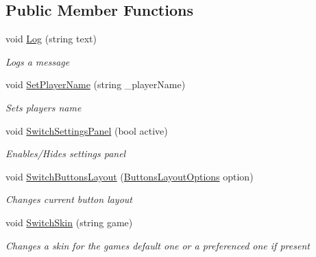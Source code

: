 \subsection*{Public Member Functions}
\begin{DoxyCompactItemize}
\item 
void \mbox{\hyperlink{class_game_pad_1_1_u_i_controller_client_ad3030f084a50b36bd6039fcad102ec37}{Log}} (string text)
\begin{DoxyCompactList}\small\item\em Logs a message \end{DoxyCompactList}\item 
void \mbox{\hyperlink{class_game_pad_1_1_u_i_controller_client_add5a4227e04750b0474cc7736111d227}{Set\+Player\+Name}} (string \+\_\+player\+Name)
\begin{DoxyCompactList}\small\item\em Sets player\textquotesingle{}s name \end{DoxyCompactList}\item 
void \mbox{\hyperlink{class_game_pad_1_1_u_i_controller_client_adf73d4fefd79c649154866d472723253}{Switch\+Settings\+Panel}} (bool active)
\begin{DoxyCompactList}\small\item\em Enables/\+Hides settings panel \end{DoxyCompactList}\item 
void \mbox{\hyperlink{class_game_pad_1_1_u_i_controller_client_a745defd9f8ebfc0c3879faf51a85f1b5}{Switch\+Buttons\+Layout}} (\mbox{\hyperlink{namespace_game_pad_ad65f651e47321df25402246e8df26c37}{Buttons\+Layout\+Options}} option)
\begin{DoxyCompactList}\small\item\em Changes current button layout \end{DoxyCompactList}\item 
void \mbox{\hyperlink{class_game_pad_1_1_u_i_controller_client_a8b12fd8cebf596535a29ef824beeadaa}{Switch\+Skin}} (string game)
\begin{DoxyCompactList}\small\item\em Changes a skin for the game\textquotesingle{}s default one or a preferenced one if present \end{DoxyCompactList}\end{DoxyCompactItemize}

